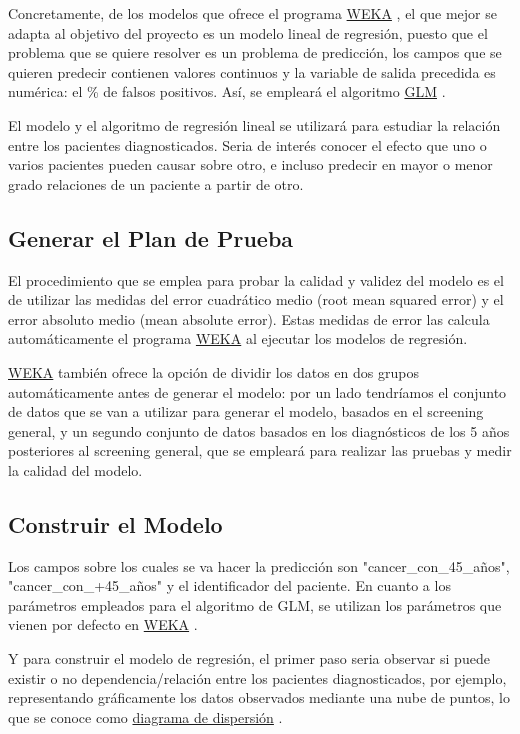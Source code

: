 \documentclass{article}
\begin{document}
Concretamente, de los modelos que ofrece el programa \href{https://www.cs.waikato.ac.nz/~ml/weka/}{WEKA} , el que mejor se adapta al objetivo del proyecto es un modelo lineal de regresión, puesto que el problema que se quiere resolver es un problema de predicción, los campos que se quieren predecir contienen valores continuos y la variable de salida precedida es numérica: el \% de falsos positivos. Así, se empleará el algoritmo \href{https://es.wikipedia.org/wiki/Modelo_lineal_generalizado}{GLM} .

El modelo y el algoritmo de regresión lineal se utilizará para estudiar la relación entre los pacientes diagnosticados. Seria de interés conocer el efecto que uno o varios pacientes pueden causar sobre otro, e incluso predecir en mayor o menor grado relaciones de un paciente a partir de otro.

\subsection{Generar el Plan de Prueba}\label{Plan de Prueba}
El procedimiento que se emplea para probar la calidad y validez del modelo es el de utilizar las medidas del error cuadrático medio (root mean squared error) y el error absoluto medio (mean absolute error). Estas medidas de error las calcula automáticamente el programa \href{https://www.cs.waikato.ac.nz/~ml/weka/}{WEKA} al ejecutar los modelos de regresión.

\href{https://www.cs.waikato.ac.nz/~ml/weka/}{WEKA} también ofrece la opción de dividir los datos en dos grupos automáticamente antes de generar el modelo: por un lado tendríamos el conjunto de datos que se van a utilizar para generar el modelo, basados en el screening general, y un segundo conjunto de datos basados en los diagnósticos de los 5 años posteriores al screening general, que se empleará para realizar las pruebas y medir la calidad del modelo. 

\subsection{Construir el Modelo}
Los campos sobre los cuales se va hacer la predicción son "cancer\_con\_45\_años", "cancer\_con\_+45\_años" y el identificador del paciente. En cuanto a los parámetros empleados para el algoritmo de GLM, se utilizan los parámetros que vienen por defecto en \href{https://www.cs.waikato.ac.nz/~ml/weka/}{WEKA} .

Y para construir el modelo de regresión, el primer paso seria observar si puede existir o no dependencia/relación entre los pacientes diagnosticados, por ejemplo, representando gráficamente los datos observados mediante una nube de puntos, lo que se conoce como \href{https://es.wikipedia.org/wiki/Diagrama_de_dispersi\%C3\%B3n}{diagrama de dispersión} .
\end{document}
